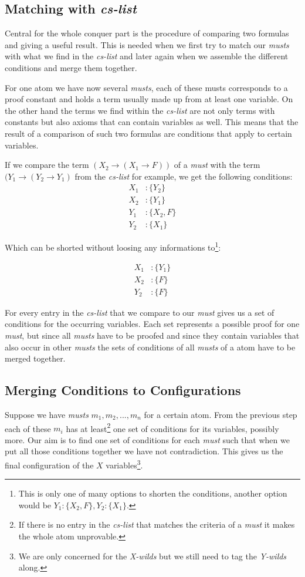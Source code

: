 \subsection{Matching with \emph{cs-list}}
Central for the whole conquer part is the procedure of comparing two formulas and giving a useful result. This is needed when we first try to match our \emph{musts} with what we find in the \emph{cs-list} and later again when we assemble the different conditions and merge them together.

For one atom we have now several \emph{musts}, each of these musts corresponds to a proof constant and holds a term usually made up from at least one variable. On the other hand the terms we find within the \emph{cs-list} are not only terms with constants but also axioms that can contain variables as well. This means that the result of a comparison of such two formulas are conditions that apply to certain variables. 

If we compare the term $(X_2 \rightarrow (X_1 \rightarrow F))$ of a \emph{must} with the term $(Y_1 \rightarrow (Y_2 \rightarrow Y_1)$ from the \emph{cs-list} for example, we get the following conditions:
\begin{align*}
	X_1 &: \{Y_2\} \\
	X_2 &: \{Y_1\} \\
	Y_1 &: \{X_2, F\} \\
	Y_2 &: \{X_1\} 
\end{align*}

Which can be shorted without loosing any informations to\footnote{This is only one of many options to shorten the conditions, another option would be $Y_1: \{X_2, F\}, Y_2:\{X_1\}$.}:

\begin{align*}
	X_1 &: \{Y_1\} \\
	X_2 &: \{F\} \\
	Y_2 &: \{F\}
\end{align*}

For every entry in the \emph{cs-list} that we compare to our \emph{must} gives us a set of conditions for the occurring variables. Each set represents a possible proof for one \emph{must}, but since all \emph{musts} have to be proofed and since they contain variables that also occur in other \emph{musts} the sets of conditions of all \emph{musts} of a atom have to be merged together.

\subsection{Merging Conditions to Configurations}
Suppose we have \emph{musts} $m_1, m_2, ..., m_n$ for a certain atom. From the previous step each of these $m_i$ has at least\footnote{If there is no entry in the \emph{cs-list} that matches the criteria of a \emph{must} it makes the whole atom unprovable.} one set of conditions for its variables, possibly more. Our aim is to find one set of conditions for each \emph{must} such that when we put all those conditions together we have not contradiction. This gives us the final configuration of the $X$ variables\footnote{We are only concerned for the \emph{X-wilds} but we still need to tag the \emph{Y-wilds} along.}.

